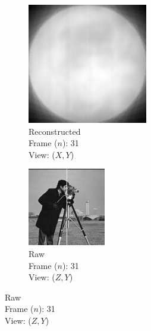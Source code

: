 \documentclass{osa-article}
\begin{document}
\begin{figure}
\begin{subfigure}[t]{0.2\linewidth}
  \end{subfigure}\hfill
  \begin{subfigure}[t]{0.2\linewidth}
    \centering
    \includegraphics[width=\linewidth]{./figures/results/3D_python/no_drift_zelda/31/xy_recon}\caption{Reconstructed\\Frame (\(n\)): 31\\View: (\(X,Y\))}\label{fig:iradon_nofilter}
  \end{subfigure}\hfill
  \begin{subfigure}[t]{0.2\linewidth}
    \centering
    \includegraphics[width=\linewidth]{./figures/results/3D_python/no_drift_zelda/31/zx}\caption{Raw\\Frame (\(n\)): 31\\View: (\(Z,Y\))}

\end{subfigure}
\end{figure}
\end{document}

